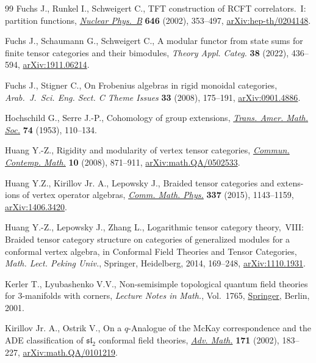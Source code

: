 \documentclass[10pt,a4paper]{amsart}
\numberwithin{equation}{section}
\begin{document}
\begin{thebibliography}{99}
Fuchs J., Runkel I., Schweigert C., {TFT} construction of {RCFT}
 correlators.~{I}: partition functions, \href{https://doi.org/10.1016/S0550-3213(02)00744-7}{\textit{Nuclear Phys.~B}} \textbf{646}
 (2002), 353--497, \href{https://arxiv.org/abs/hep-th/0204148}{arXiv:hep-th/0204148}.

Fuchs J., Schaumann G., Schweigert C., A modular functor from state sums for
 finite tensor categories and their bimodules, \textit{Theory Appl. Categ.}
 \textbf{38} (2022), 436--594, \href{https://arxiv.org/abs/1911.06214}{arXiv:1911.06214}.

Fuchs J., Stigner C., On {F}robenius algebras in rigid monoidal categories,
 \textit{Arab.~J.~Sci. Eng. Sect. C Theme Issues} \textbf{33} (2008),
 175--191, \href{https://arxiv.org/abs/0901.4886}{arXiv:0901.4886}.

Hochschild G., Serre J.-P., Cohomology of group extensions, \href{https://doi.org/10.2307/1990851}{\textit{Trans. Amer.
 Math. Soc.}} \textbf{74} (1953), 110--134.

Huang Y.-Z., Rigidity and modularity of vertex tensor categories,
 \href{https://doi.org/10.1142/S0219199708003083}{\textit{Commun. Contemp. Math.}} \textbf{10} (2008), 871--911,
 \href{https://arxiv.org/abs/math.QA/0502533}{arXiv:math.QA/0502533}.

Huang Y.Z., Kirillov Jr. A., Lepowsky J., Braided tensor categories and
 extens-ions of vertex operator algebras, \href{https://doi.org/10.1007/s00220-015-2292-1}{\textit{Comm. Math. Phys.}}
 \textbf{337} (2015), 1143--1159, \href{https://arxiv.org/abs/1406.3420}{arXiv:1406.3420}.

Huang Y.-Z., Lepowsky J., Zhang L., Logarithmic tensor category theory,~{VIII}:
 {B}raided tensor category structure on categories of generalized modules for
 a conformal vertex algebra, in Conformal {F}ield {T}heories and {T}ensor
 {C}ategories, \textit{Math. Lect. Peking Univ.}, Springer, Heidelberg, 2014, 169--248,
 \href{https://arxiv.org/abs/1110.1931}{arXiv:1110.1931}.

Kerler T., Lyubashenko V.V., Non-semisimple topological quantum field theories
 for 3-manifolds with corners, \textit{Lecture Notes in Math.}, Vol.~1765,
 \href{https://doi.org/10.1007/b82618}{Springer}, Berlin, 2001.

Kirillov Jr. A., Ostrik V., On a {$q$}-{A}nalogue of the {M}c{K}ay
 correspondence and the {ADE} classification of {$\mathfrak{sl}_2$} conformal
 field theories, \href{https://doi.org/10.1006/aima.2002.2072}{\textit{Adv. Math.}} \textbf{171} (2002), 183--227,
 \href{https://arxiv.org/abs/math.QA/0101219}{arXiv:math.QA/0101219}.


\end{thebibliography}
\end{document}
